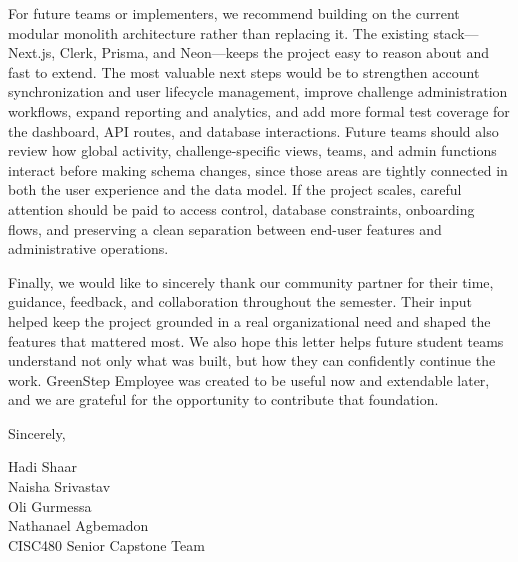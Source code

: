 \documentclass[12pt]{article}
\begin{document}
\medskip

\noindent
For future teams or implementers, we recommend building on the current modular monolith architecture rather than replacing it. The existing stack---Next.js, Clerk, Prisma, and Neon---keeps the project easy to reason about and fast to extend. The most valuable next steps would be to strengthen account synchronization and user lifecycle management, improve challenge administration workflows, expand reporting and analytics, and add more formal test coverage for the dashboard, API routes, and database interactions. Future teams should also review how global activity, challenge-specific views, teams, and admin functions interact before making schema changes, since those areas are tightly connected in both the user experience and the data model. If the project scales, careful attention should be paid to access control, database constraints, onboarding flows, and preserving a clean separation between end-user features and administrative operations.

\medskip

\noindent
Finally, we would like to sincerely thank our community partner for their time, guidance, feedback, and collaboration throughout the semester. Their input helped keep the project grounded in a real organizational need and shaped the features that mattered most. We also hope this letter helps future student teams understand not only what was built, but how they can confidently continue the work. GreenStep Employee was created to be useful now and extendable later, and we are grateful for the opportunity to contribute that foundation.

\medskip

\noindent
Sincerely,

\medskip

\noindent
Hadi Shaar\\
Naisha Srivastav\\
Oli Gurmessa\\
Nathanael Agbemadon\\
CISC480 Senior Capstone Team
\end{document}
